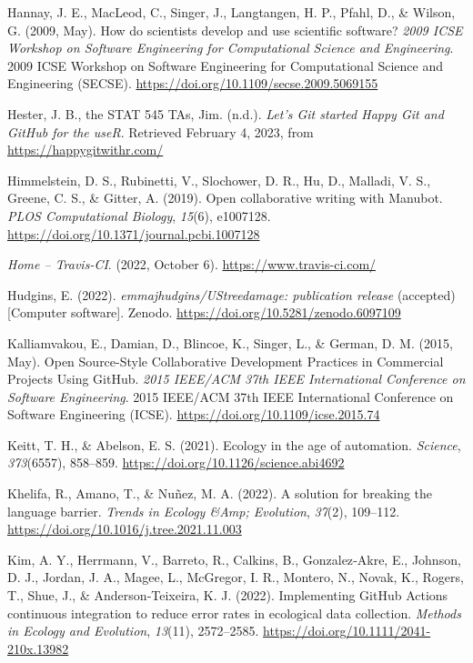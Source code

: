 \begin{CSLReferences}{1}{0}
\leavevmode{}%
Hannay, J. E., MacLeod, C., Singer, J., Langtangen, H. P., Pfahl, D., \& Wilson, G. (2009, May). How do scientists develop and use scientific software? \emph{2009 ICSE Workshop on Software Engineering for Computational Science and Engineering}. 2009 ICSE Workshop on Software Engineering for Computational Science and Engineering (SECSE). \url{https://doi.org/10.1109/secse.2009.5069155}

\leavevmode{}%
Hester, J. B., the STAT 545 TAs, Jim. (n.d.). \emph{Let's Git started \textbar{} Happy Git and GitHub for the useR}. Retrieved February 4, 2023, from \url{https://happygitwithr.com/}

\leavevmode{}%
Himmelstein, D. S., Rubinetti, V., Slochower, D. R., Hu, D., Malladi, V. S., Greene, C. S., \& Gitter, A. (2019). Open collaborative writing with Manubot. \emph{PLOS Computational Biology}, \emph{15}(6), e1007128. \url{https://doi.org/10.1371/journal.pcbi.1007128}

\leavevmode{}%
\emph{Home -- Travis-CI}. (2022, October 6). \url{https://www.travis-ci.com/}

\leavevmode{}%
Hudgins, E. (2022). \emph{emmajhudgins/UStreedamage: publication release} (accepted) {[}Computer software{]}. Zenodo. \url{https://doi.org/10.5281/zenodo.6097109}

\leavevmode{}%
Kalliamvakou, E., Damian, D., Blincoe, K., Singer, L., \& German, D. M. (2015, May). Open Source-Style Collaborative Development Practices in Commercial Projects Using GitHub. \emph{2015 IEEE/ACM 37th IEEE International Conference on Software Engineering}. 2015 IEEE/ACM 37th IEEE International Conference on Software Engineering (ICSE). \url{https://doi.org/10.1109/icse.2015.74}

\leavevmode{}%
Keitt, T. H., \& Abelson, E. S. (2021). Ecology in the age of automation. \emph{Science}, \emph{373}(6557), 858--859. \url{https://doi.org/10.1126/science.abi4692}

\leavevmode{}%
Khelifa, R., Amano, T., \& Nuñez, M. A. (2022). A solution for breaking the language barrier. \emph{Trends in Ecology \&Amp; Evolution}, \emph{37}(2), 109--112. \url{https://doi.org/10.1016/j.tree.2021.11.003}

\leavevmode{}%
Kim, A. Y., Herrmann, V., Barreto, R., Calkins, B., Gonzalez‐Akre, E., Johnson, D. J., Jordan, J. A., Magee, L., McGregor, I. R., Montero, N., Novak, K., Rogers, T., Shue, J., \& Anderson‐Teixeira, K. J. (2022). Implementing GitHub Actions continuous integration to reduce error rates in ecological data collection. \emph{Methods in Ecology and Evolution}, \emph{13}(11), 2572--2585. \url{https://doi.org/10.1111/2041-210x.13982}


\end{CSLReferences}
